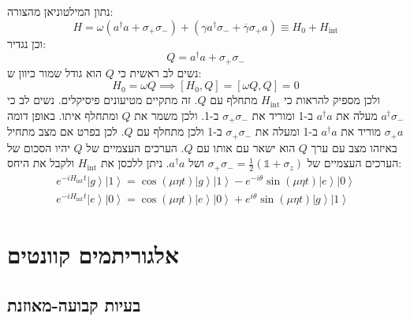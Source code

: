 \documentclass{tstextbook}
\begin{document}
\begin{example}
נתון המילטוניאן מהצורה:
$$H=\omega\left(a^{\dagger}a+\sigma_{+}\sigma_{-}\right)+\left(\gamma a^{\dagger}\sigma_{-}+\overline{{{\gamma}}}\sigma_{+}a\right)\equiv H_{0}+H_{\mathrm{int}}$$
וכן נגדיר:
$$Q=a^{\dagger}a+\sigma_{+}\sigma_{-}$$
נשים לב ראשית כי \(Q\) הוא גודל שמור כיוון ש:
$$H_{0}=\omega Q\implies [H_{0},Q]=\left[ \omega Q,Q \right]=0$$
ולכן מספיק להראות כי \(H_{\text{int}}\) מתחלף עם \(Q\). זה מתקיים מטיעונים פיסיקלים. נשים לב כי \(a^{\dagger}\sigma_{-}\) מעלה את \(a^{\dagger}a\) ב-1 ומוריד את \(\sigma_{+}\sigma_{-}\) ב-1. ולכן משמר את \(Q\) ומתחלף איתו. באופן דומה \(\sigma_{+}a\) מוריד את \(a^{\dagger}a\) ב-1 ומעלה את \(\sigma_{+}\sigma_{-}\) ב-1 ולכן מתחלף עם \(Q\). לכן בפרט אם מצב מתחיל באיזהו מצב עם ערך \(Q\) הוא ישאר עם אותו עם \(Q\).
הערכים העצמיים של \(Q\) יהיו הסכום של הערכים העצמיים של \(\sigma_{+}\sigma_{-}=\frac{1}{2}\left( \mathbb{1}+\sigma_{z} \right)\) ושל \(a^{\dagger}a\).
ניתן ללכסן את \(H_{\text{int}}\) ולקבל את היחס:
$$\begin{gather}e^{-i H_{\mathrm{int}}t}\left|g\right\rangle\left|1\right\rangle=\cos\left(\mu\eta t\right)\left|g\right\rangle\left|1\right\rangle-e^{-i\theta}\sin\left(\mu\eta t\right)\left|e\right\rangle\left|0\right\rangle\\ e^{-i H_{\mathrm{int}}t}\left|e\right\rangle\left|0\right\rangle=\cos\left(\mu\eta t\right)\left|e\right\rangle\left|0\right\rangle+e^{i\theta}\sin\left(\mu\eta t\right)\left|g\right\rangle\left|1\right\rangle 
\end{gather}$$

\end{example}
\section{אלגוריתמים קוונטים}

\subsection{בעיות קבועה-מאוזנת}
\end{document}
